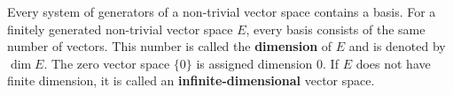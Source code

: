 Every system of generators of a non-trivial vector space contains a basis. For a finitely generated non-trivial vector space $E$, every basis consists of the same number of vectors. This number is called the \textbf{dimension} of $E$ and is denoted by $\dim E$. The zero vector space $\{0\}$ is assigned dimension $0$. If $E$ does not have finite dimension, it is called an \textbf{infinite-dimensional} vector space.
